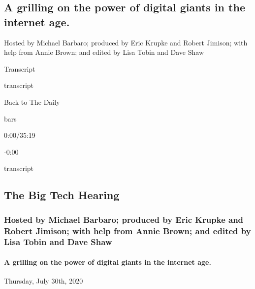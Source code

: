 \hypertarget{a-grilling-on-the-power-of-digital-giants-in-the-internet-age-1}{%
\subsection{A grilling on the power of digital giants in the internet
age.}\label{a-grilling-on-the-power-of-digital-giants-in-the-internet-age-1}}

Hosted by Michael Barbaro; produced by Eric Krupke and Robert Jimison;
with help from Annie Brown; and edited by Lisa Tobin and Dave Shaw

Transcript

transcript

Back to The Daily

bars

0:00/35:19

-0:00

transcript

\hypertarget{the-big-tech-hearing-2}{%
\subsection{The Big Tech Hearing}\label{the-big-tech-hearing-2}}

\hypertarget{hosted-by-michael-barbaro-produced-by-eric-krupke-and-robert-jimison-with-help-from-annie-brown-and-edited-by-lisa-tobin-and-dave-shaw-1}{%
\subsubsection{Hosted by Michael Barbaro; produced by Eric Krupke and
Robert Jimison; with help from Annie Brown; and edited by Lisa Tobin and
Dave
Shaw}\label{hosted-by-michael-barbaro-produced-by-eric-krupke-and-robert-jimison-with-help-from-annie-brown-and-edited-by-lisa-tobin-and-dave-shaw-1}}

\hypertarget{a-grilling-on-the-power-of-digital-giants-in-the-internet-age-2}{%
\paragraph{A grilling on the power of digital giants in the internet
age.}\label{a-grilling-on-the-power-of-digital-giants-in-the-internet-age-2}}

Thursday, July 30th, 2020


